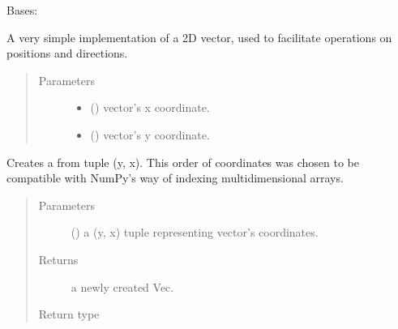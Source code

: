 \documentclass[letterpaper,10pt,english,openany,oneside]{sphinxmanual}
\begin{document}

\begin{fulllineitems}
\label{\detokenize{util:util.Vec}}
Bases: 

A very simple implementation of a 2D vector, used to facilitate operations
on positions and directions.
\begin{quote}\begin{description}
\item[{Parameters}] \leavevmode\begin{itemize}
\item {} 
 () \textendash{} vector’s x coordinate.

\item {} 
 () \textendash{} vector’s y coordinate.

\end{itemize}

\end{description}\end{quote}

\begin{fulllineitems}
\label{\detokenize{util:util.Vec.fromtuple}}
Creates a {\hyperref[\detokenize{util:util.Vec}]{}} from tuple (y, x). This order of coordinates
was chosen to be compatible with NumPy’s way of indexing
multidimensional arrays.
\begin{quote}\begin{description}
\item[{Parameters}] \leavevmode
{} () \textendash{} a (y, x) tuple representing vector’s coordinates.

\item[{Returns}] \leavevmode
a newly created Vec.

\item[{Return type}] \leavevmode
{\hyperref[\detokenize{util:util.Vec}]{}}


\end{description}
\end{quote}
\end{fulllineitems}
\end{fulllineitems}
\end{document}

